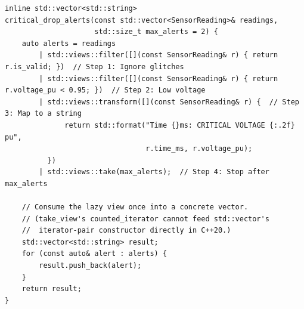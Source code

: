 \begin{verbatim}
inline std::vector<std::string>
critical_drop_alerts(const std::vector<SensorReading>& readings,
                     std::size_t max_alerts = 2) {
    auto alerts = readings
        | std::views::filter([](const SensorReading& r) { return r.is_valid; })  // Step 1: Ignore glitches
        | std::views::filter([](const SensorReading& r) { return r.voltage_pu < 0.95; })  // Step 2: Low voltage
        | std::views::transform([](const SensorReading& r) {  // Step 3: Map to a string
              return std::format("Time {}ms: CRITICAL VOLTAGE {:.2f} pu",
                                 r.time_ms, r.voltage_pu);
          })
        | std::views::take(max_alerts);  // Step 4: Stop after max_alerts

    // Consume the lazy view once into a concrete vector.
    // (take_view's counted_iterator cannot feed std::vector's
    //  iterator-pair constructor directly in C++20.)
    std::vector<std::string> result;
    for (const auto& alert : alerts) {
        result.push_back(alert);
    }
    return result;
}
\end{verbatim}
